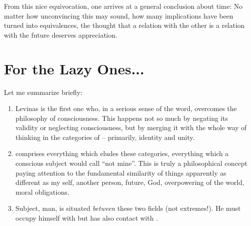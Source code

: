 From this nice equivocation, one arrives at a general conclusion about time: 
No matter how unconvincing this may sound, how many implications have been turned into 
equivalences, the thought that a relation with the other is a
relation with the future deserves appreciation.

\newpage\section{For the Lazy Ones...}\label{sec:lazy}
Let me summarize briefly:
\begin{enumerate}\MyLPar
\item
Levinas is the first one who, in a serious sense of the word, overcomes the philosophy of
consciousness. This happens not so much by negating its validity or neglecting consciousness,  
but by merging it with the whole way of thinking in the categories of  -- primarily, identity 
and unity. 
\item
{} comprises everything which eludes these categories, everything which a conscious
subject would call ``not mine''. This is truly a philosophical concept paying attention to the
fundamental similarity of things apparently as different as my self, another person, future, God, 
overpowering of the world, moral obligations.
\item
Subject, man, is situated {\em between} these two fields (not extremes!). He must occupy himself with 
 but has also contact with .


\end{enumerate}
